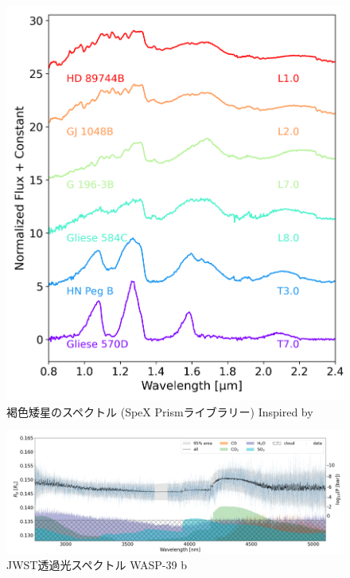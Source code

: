 \begin{figure}[]
 \begin{center}
	\includegraphics[width=\linewidth]{fig/bdspectra.png}
\end{center}
	\caption{褐色矮星のスペクトル (SpeX Prismライブラリー) Inspired by\cite{2025ApJ...988...31L}}
	\label{fig:bd}
\end{figure} 


\begin{figure}[htb]
 \begin{center}
	\includegraphics[width=\linewidth]{fig/jwst_spectrum.png}
\end{center}
	\caption{JWST透過光スペクトル WASP-39 b \cite{2025ApJ...985..263K}}
	\label{fig:jwst}
\end{figure} 


